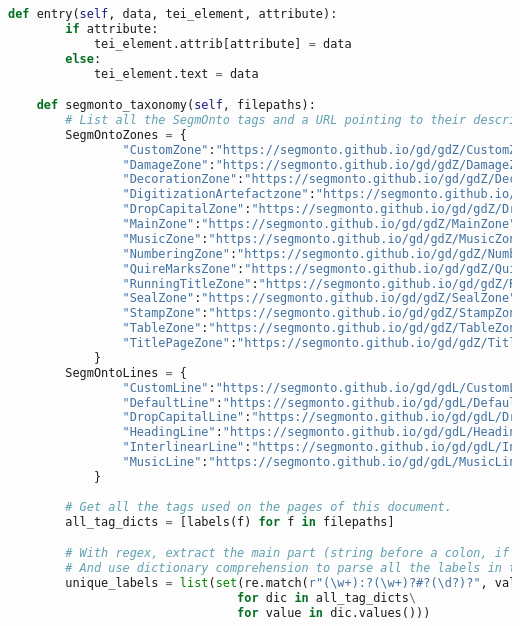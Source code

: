 \documentclass[class=article, crop=false]{standalone}
\begin{document}
\begin{lstlisting}[language=python, style=python]
    def entry(self, data, tei_element, attribute):
        if attribute:
            tei_element.attrib[attribute] = data
        else:
            tei_element.text = data

    def segmonto_taxonomy(self, filepaths):
        # List all the SegmOnto tags and a URL pointing to their description.
        SegmOntoZones = {
                "CustomZone":"https://segmonto.github.io/gd/gdZ/CustomZone/",
                "DamageZone":"https://segmonto.github.io/gd/gdZ/DamageZone",
                "DecorationZone":"https://segmonto.github.io/gd/gdZ/DecorationZone",
                "DigitizationArtefactzone":"https://segmonto.github.io/gd/gdZ/DigitizationArtefactzone",
                "DropCapitalZone":"https://segmonto.github.io/gd/gdZ/DropCapitalZone",
                "MainZone":"https://segmonto.github.io/gd/gdZ/MainZone",
                "MusicZone":"https://segmonto.github.io/gd/gdZ/MusicZone",
                "NumberingZone":"https://segmonto.github.io/gd/gdZ/NumberingZone",
                "QuireMarksZone":"https://segmonto.github.io/gd/gdZ/QuireMarksZone",
                "RunningTitleZone":"https://segmonto.github.io/gd/gdZ/RunningTitleZone",
                "SealZone":"https://segmonto.github.io/gd/gdZ/SealZone",
                "StampZone":"https://segmonto.github.io/gd/gdZ/StampZone",
                "TableZone":"https://segmonto.github.io/gd/gdZ/TableZone",
                "TitlePageZone":"https://segmonto.github.io/gd/gdZ/TitlePageZone"
            }
        SegmOntoLines = {
                "CustomLine":"https://segmonto.github.io/gd/gdL/CustomLine/",
                "DefaultLine":"https://segmonto.github.io/gd/gdL/DefaultLine",
                "DropCapitalLine":"https://segmonto.github.io/gd/gdL/DropCapitalLine",
                "HeadingLine":"https://segmonto.github.io/gd/gdL/HeadingLine",
                "InterlinearLine":"https://segmonto.github.io/gd/gdL/InterlinearLine",
                "MusicLine":"https://segmonto.github.io/gd/gdL/MusicLine"
            }
        
        # Get all the tags used on the pages of this document.
        all_tag_dicts = [labels(f) for f in filepaths]

        # With regex, extract the main part (string before a colon, if present) of a label in the tag dictionary.
        # And use dictionary comprehension to parse all the labels in the document's tags dictionaries.
        unique_labels = list(set(re.match(r"(\w+):?(\w+)?#?(\d?)?", value).group(1)\
                                for dic in all_tag_dicts\
                                for value in dic.values()))


\end{lstlisting}
\end{document}
